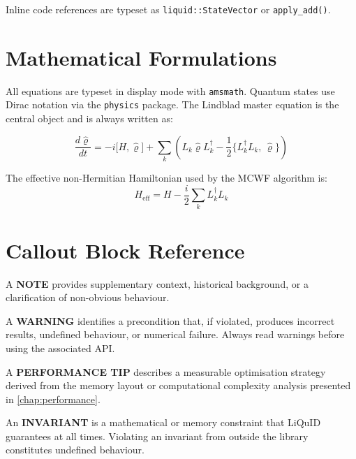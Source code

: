 \documentclass[11pt,a4paper,twoside]{book}
\newcommand{\Heff}{H_{\mathrm{eff}}}
\newcommand{\HeffDef}{H - \frac{i}{2}\sum_k L_k^\dagger L_k}
\newcommand{\densmat}{\hat{\varrho}}    %
\newcommand{\code}[1]{\texttt{\small#1}}
\theoremstyle{definition}
\theoremstyle{remark}
\begin{document}
Inline code references are typeset as \code{liquid::StateVector} or
\code{apply\_add()}.

\section*{Mathematical Formulations}

All equations are typeset in display mode with \texttt{amsmath}.
Quantum states use Dirac notation via the \texttt{physics} package.
The Lindblad master equation is the central object and is always written as:

\begin{equation}
  \frac{d\densmat}{dt}
    = -i\bigl[H, \densmat\bigr]
      + \sum_k \left(
          L_k \densmat L_k^\dagger
          - \frac{1}{2}\bigl\{L_k^\dagger L_k,\, \densmat\bigr\}
        \right)
  \label{eq:lindblad-master}
\end{equation}

The effective non-Hermitian Hamiltonian used by the MCWF algorithm is:
\begin{equation}
  \Heff = \HeffDef
  \label{eq:heff-def}
\end{equation}

\section*{Callout Block Reference}

\begin{notebox}
  A \textbf{NOTE} provides supplementary context, historical background,
  or a clarification of non-obvious behaviour.
\end{notebox}

\begin{warnbox}
  A \textbf{WARNING} identifies a precondition that, if violated, produces
  incorrect results, undefined behaviour, or numerical failure. Always read
  warnings before using the associated API.
\end{warnbox}

\begin{perfbox}
  A \textbf{PERFORMANCE TIP} describes a measurable optimisation strategy
  derived from the memory layout or computational complexity analysis
  presented in \cref{chap:performance}.
\end{perfbox}

\begin{invbox}
  An \textbf{INVARIANT} is a mathematical or memory constraint that
  LiQuID guarantees at all times. Violating an invariant from outside
  the library constitutes undefined behaviour.
\end{invbox}
\end{document}
